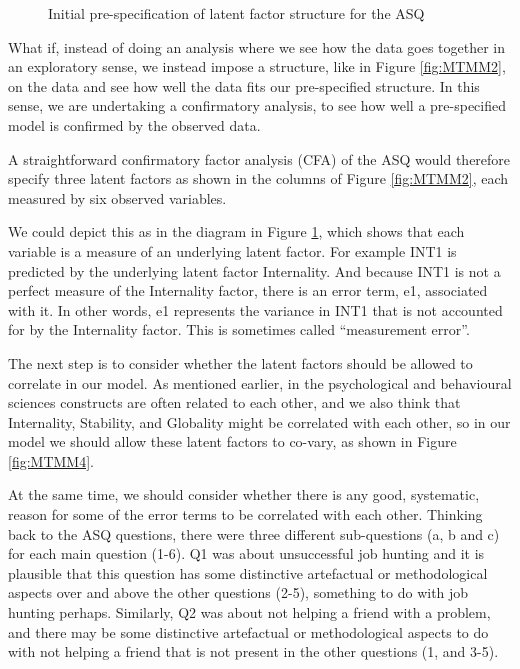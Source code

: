 \begin{figure}[p]
\begin{center}
\caption{Initial pre-specification of latent factor structure for the ASQ}
\label{fig:MTMM3}
\HR
\end{center}
\end{figure}

What if, instead of doing an analysis where we see how the data goes together in an exploratory sense, we instead impose a structure, like in Figure \ref{fig:MTMM2}, on the data and see how well the data fits our pre-specified structure. In this sense, we are undertaking a confirmatory analysis, to see how well a pre-specified model is confirmed by the observed data.

A straightforward confirmatory factor analysis (CFA) of the ASQ would therefore specify three latent factors as shown in the columns of Figure \ref{fig:MTMM2}, each measured by six observed variables. 

We could depict this as in the diagram in Figure \ref{fig:MTMM3}, which shows that each variable is a measure of an underlying latent factor. For example INT1 is predicted by the underlying latent factor Internality. And because INT1 is not a perfect measure of the Internality factor, there is an error term, e1, associated with it. In other words, e1 represents the variance in INT1 that is not accounted for by the Internality factor. This is sometimes called “measurement error”.

The next step is to consider whether the latent factors should be allowed to correlate in our model. As mentioned earlier, in the psychological and behavioural sciences constructs are often related to each other, and we also think that Internality, Stability, and Globality might be correlated with each other, so in our model we should allow these latent factors to co-vary, as shown in Figure \ref{fig:MTMM4}. 

At the same time, we should consider whether there is any good, systematic, reason for some of the error terms to be correlated with each other. Thinking back to the ASQ questions, there were three different sub-questions (a, b and c) for each main question (1-6). Q1 was about unsuccessful job hunting and it is plausible that this question has some distinctive artefactual or methodological aspects over and above the other questions (2-5), something to do with job hunting perhaps. Similarly, Q2 was about not helping a friend with a problem, and there may be some distinctive artefactual or methodological aspects to do with not helping a friend that is not present in the other questions (1, and 3-5).
 

